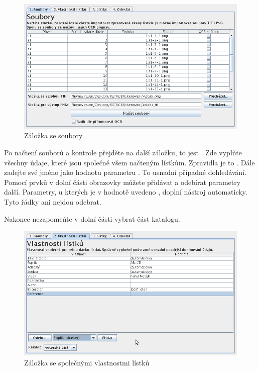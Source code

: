 \begin{figure}
\label{fig:u2a}
\centering
\includegraphics[width=\textwidth]{u2a.png}
\caption{Záložka se soubory}
\end{figure}

Po načtení souborů a kontrole přejděte na další záložku, to jest . Zde vyplňte všechny údaje, které jsou společné všem načteným lístkům. Zpravidla je to . Dále zadejte své jméno jako hodnotu parametru . To usnadní případné dohledávání. Pomocí prvků v dolní části obrazovky můžete přidávat a odebírat parametry další. Parametry, u kterých je v hodnotě uvedeno , doplní nástroj automaticky. Tyto řádky ani nejdou odebrat.

Nakonec nezapomeňte v dolní části vybrat část katalogu.

\begin{figure}
\label{fig:u2b}
\centering
\includegraphics[width=\textwidth]{u2b.png}
\caption{Záložka se společnými vlastnostmi lístků}
\end{figure}

